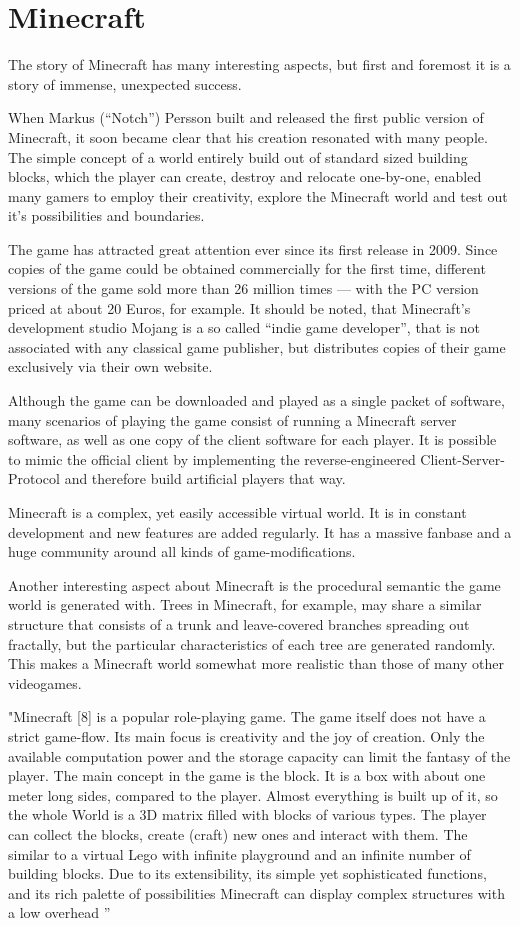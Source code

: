 \chapter{Minecraft}
The story of Minecraft has many interesting aspects, but first and foremost it is a story of immense, unexpected success.

When Markus (``Notch'') Persson built and released the first public version of Minecraft, it soon became clear that his creation resonated with many people. The simple concept of a world entirely build out of standard sized building blocks, which the player can create, destroy and relocate one-by-one, enabled many gamers to employ their creativity, explore the Minecraft world and test out it's possibilities and boundaries.

The game has attracted great attention ever since its first release in 2009. Since copies of the game could be obtained commercially for the first time, different versions of the game sold more than 26 million times --- with the PC version priced at about 20 Euros, for example. It should be noted, that Minecraft's development studio Mojang is a so called ``indie game developer'', that is not associated with any classical game publisher, but distributes copies of their game exclusively via their own website.

Although the game can be downloaded and played as a single packet of software, many scenarios of playing the game consist of running a Minecraft server software, as well as one copy of the client software for each player. It is possible to mimic the official client by implementing the reverse-engineered Client-Server-Protocol and therefore build artificial players that way.

Minecraft is a complex, yet easily accessible virtual world. It is in constant development and new features are added regularly. It has a massive fanbase and a huge community around all kinds of game-modifications.

Another interesting aspect about Minecraft is the procedural semantic the game world is generated with. Trees in Minecraft, for example, may share a similar structure that consists of a trunk and leave-covered branches spreading out fractally, but the particular characteristics of each tree are generated randomly. This makes a Minecraft world somewhat more realistic than those of many other videogames.

"Minecraft [8] is a popular role-playing game. The game
itself does not have a strict game-flow. Its main focus is creativity and the joy of creation. Only the available computation
power and the storage capacity can limit the fantasy of the
player.
The main concept in the game is the block. It is a box with
about one meter long sides, compared to the player. Almost
everything is built up of it, so the whole World is a 3D matrix
filled with blocks of various types. The player can collect the
blocks, create (craft) new ones 
and interact with them. The
similar to a virtual Lego with 
infinite playground and
an infinite number of building blocks.
Due to its extensibility, its simple yet sophisticated functions, and its rich palette of possibilities Minecraft can display
complex structures
 with a low 
 overhead
''

